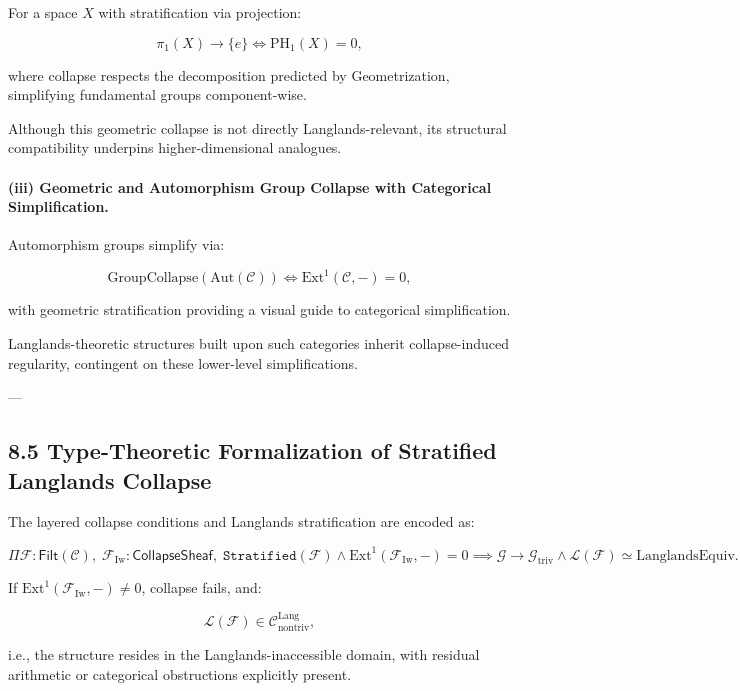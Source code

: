 \documentclass[11pt]{article}
\begin{document}
For a space \( X \) with stratification via projection:

\[
\pi_1(X) \longrightarrow \{e\} \iff \mathrm{PH}_1(X) = 0,
\]

where collapse respects the decomposition predicted by Geometrization, simplifying fundamental groups component-wise.

Although this geometric collapse is not directly Langlands-relevant, its structural compatibility underpins higher-dimensional analogues.

\paragraph{(iii) Geometric and Automorphism Group Collapse with Categorical Simplification.}

Automorphism groups simplify via:

\[
\mathrm{GroupCollapse}(\mathrm{Aut}(\mathcal{C})) \iff \mathrm{Ext}^1(\mathcal{C}, -) = 0,
\]

with geometric stratification providing a visual guide to categorical simplification.

Langlands-theoretic structures built upon such categories inherit collapse-induced regularity, contingent on these lower-level simplifications.

---

\subsection*{8.5 Type-Theoretic Formalization of Stratified Langlands Collapse}

The layered collapse conditions and Langlands stratification are encoded as:

\[
\Pi \mathcal{F} : \mathsf{Filt}(\mathcal{C}), \;
\mathcal{F}_{\mathrm{Iw}} : \mathsf{CollapseSheaf}, \;
\texttt{Stratified}(\mathcal{F}) \wedge \mathrm{Ext}^1(\mathcal{F}_{\mathrm{Iw}}, -) = 0 
\implies 
\mathcal{G} \longrightarrow \mathcal{G}_{\mathrm{triv}} \wedge \mathcal{L}(\mathcal{F}) \simeq \mathrm{LanglandsEquiv}.
\]

If \( \mathrm{Ext}^1(\mathcal{F}_{\mathrm{Iw}}, -) \neq 0 \), collapse fails, and:

\[
\mathcal{L}(\mathcal{F}) \in \mathcal{C}_{\mathrm{nontriv}}^{\mathrm{Lang}},
\]

i.e., the structure resides in the Langlands-inaccessible domain, with residual arithmetic or categorical obstructions explicitly present.
\end{document}
